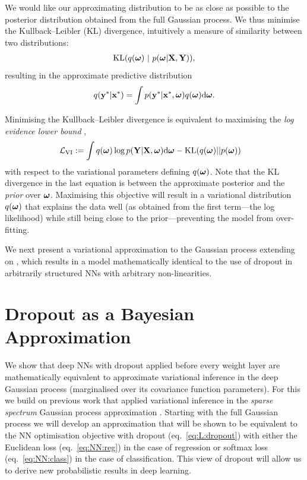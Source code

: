 \documentclass{article} %
\newcommand{\cL}{\mathcal{L}}
\newcommand{\td}{\text{d}}
\newcommand{\x}{\mathbf{x}}
\newcommand{\y}{\mathbf{y}}
\newcommand{\X}{\mathbf{X}}
\newcommand{\Y}{\mathbf{Y}}
\newcommand{\bo}{\text{\boldmath$\omega$}}
\newcommand{\KL}{\text{KL}}
\theoremstyle{definition}
\begin{document}
We would like our approximating distribution to be as close as possible to the posterior distribution obtained from the full Gaussian process. We thus minimise the Kullback--Leibler (KL) divergence, intuitively a measure of similarity between two distributions:
\begin{align*}
\KL(q(\bo) ~|~ p(\bo | \X, \Y)),
\end{align*}
resulting in the approximate predictive distribution 
\begin{align} \label{eq:predictive_dist}
q(\y^* | \x^*) = \int p(\y^* | \x^*, \bo) q(\bo)\td \bo.
\end{align}

Minimising the Kullback--Leibler divergence is equivalent to maximising the \textit{log evidence lower bound} \citep{Bishop2006Pattern},
\begin{align}
&\cL_{\text{VI}} := \int q(\bo) \log p(\Y | \X, \bo) \td \bo - \KL(q(\bo) || p(\bo)) \label{eq:L:VI}
\end{align}
with respect to the variational parameters defining $q(\bo)$. Note that the KL divergence in the last equation is between the approximate posterior and the \textit{prior} over $\bo$. Maximising this objective will result in a variational distribution $q(\bo)$ that explains the data well (as obtained from the first term---the log likelihood) while still being close to the prior---preventing the model from over-fitting.

We next present a variational approximation to the Gaussian process extending on \citep{Gal2015Improving}, which results in a model mathematically identical to the use of dropout in arbitrarily structured NNs with arbitrary non-linearities.

\section{Dropout as a Bayesian Approximation}


We show that deep NNs with dropout applied before every weight layer are mathematically equivalent to approximate variational inference in the deep Gaussian process (marginalised over its covariance function parameters). For this we build on previous work \citep{Gal2015Improving} that applied variational inference in the \textit{sparse spectrum} Gaussian process approximation \citep{lazaro2010sparse}. Starting with the full Gaussian process we will develop an approximation that will be shown to be equivalent to the NN optimisation objective with dropout (eq.\ \eqref{eq:L:dropout}) with either the Euclidean loss (eq.\ \eqref{eq:NN:reg}) in the case of regression or softmax loss (eq.\ \eqref{eq:NN:class}) in the case of classification. This view of dropout will allow us to derive new  probabilistic results in deep learning. %
\end{document}
